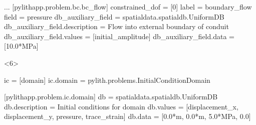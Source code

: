 \documentclass[aspectratio=169]{beamer}
\begin{document}
\begin{frame}[t,fragile]
\begin{minipage}[t]{0.67\textwidth}
\begin{onlyenv}
\begin{cfgcode}
        ...
        [pylithapp.problem.bc.bc_flow]
        constrained_dof = [0]
        label = boundary_flow
        field = pressure
        db_auxiliary_field = spatialdata.spatialdb.UniformDB
        db_auxiliary_field.description = Flow into external boundary of conduit
        db_auxiliary_field.values = [initial_amplitude]
        db_auxiliary_field.data = [10.0*MPa]
      \end{cfgcode}
    \end{onlyenv}
    \begin{onlyenv}<6>
      \begin{cfgcode}
        ic = [domain]
        ic.domain = pylith.problems.InitialConditionDomain

        [pylithapp.problem.ic.domain]
        db = spatialdata.spatialdb.UniformDB
        db.description = Initial conditions for domain
        db.values = [displacement_x, displacement_y, pressure, trace_strain]
        db.data = [0.0*m, 0.0*m, 5.0*MPa, 0.0]
      \end{cfgcode}
    \end{onlyenv}
  \end{minipage}

    

  
\end{frame}

\end{document}
